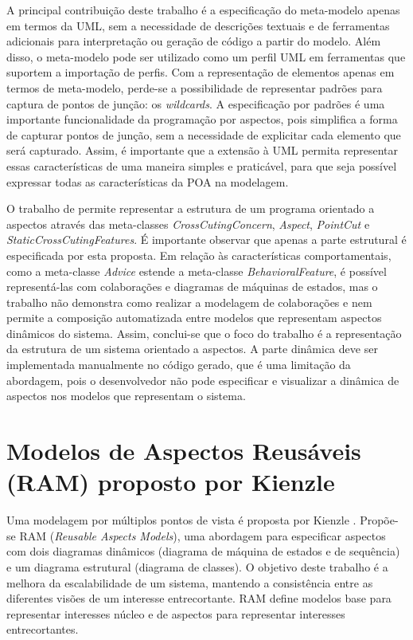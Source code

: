 A principal contribuição deste trabalho é a especificação do meta-modelo apenas em termos da UML, sem a necessidade de descrições textuais e de
ferramentas adicionais para interpretação ou geração de código a partir do modelo. Além disso, o meta-modelo pode ser utilizado como um perfil UML em
ferramentas que suportem a importação de perfis. Com a representação de elementos apenas em termos de meta-modelo, perde-se a possibilidade de
representar padrões para captura de pontos de junção: os \textit{wildcards}. A especificação por padrões é uma importante
funcionalidade da programação por aspectos, pois simplifica a forma de capturar pontos de junção, sem a necessidade de explicitar cada elemento que
será capturado. Assim, é importante que a extensão à UML permita representar essas características de uma maneira simples e praticável, para que seja
possível expressar todas as características da POA na modelagem.

O trabalho de \cite{Evermann:2007:MSP:1229375.1229379} permite representar a estrutura de um programa orientado a aspectos através das meta-classes
\textit{CrossCutingConcern}, \textit{Aspect}, \textit{PointCut} e \textit{StaticCrossCutingFeatures}. É importante observar que apenas a parte
estrutural é especificada por esta proposta. Em relação às características comportamentais, como a meta-classe \textit{Advice} estende a meta-classe
\textit{BehavioralFeature}, é possível representá-las com colaborações e diagramas de máquinas de estados, mas o trabalho não demonstra como realizar
a modelagem de colaborações e nem permite a composição automatizada entre modelos que representam aspectos dinâmicos do sistema. Assim, conclui-se que
o foco do trabalho é a representação da estrutura de um sistema orientado a aspectos. A parte dinâmica deve ser implementada manualmente no código
gerado, que é uma limitação da abordagem, pois o desenvolvedor não pode especificar e visualizar a dinâmica de aspectos nos modelos que
representam o sistema.

\section{Modelos de Aspectos Reusáveis (RAM) proposto por Kienzle}

Uma modelagem por múltiplos pontos de vista é proposta por Kienzle \cite{Kienzle:2009:AMM:1509239.1509252} \cite{Kienzle2010}. Propõe-se RAM
(\textit{Reusable Aspects Models}), uma abordagem para especificar aspectos com dois diagramas dinâmicos (diagrama de máquina de estados e de sequência) e um diagrama estrutural (diagrama de
classes). O objetivo deste trabalho é a melhora da escalabilidade de um sistema, mantendo a consistência entre as diferentes visões de um interesse
entrecortante. RAM define modelos base para representar interesses núcleo e de aspectos para representar interesses entrecortantes.

